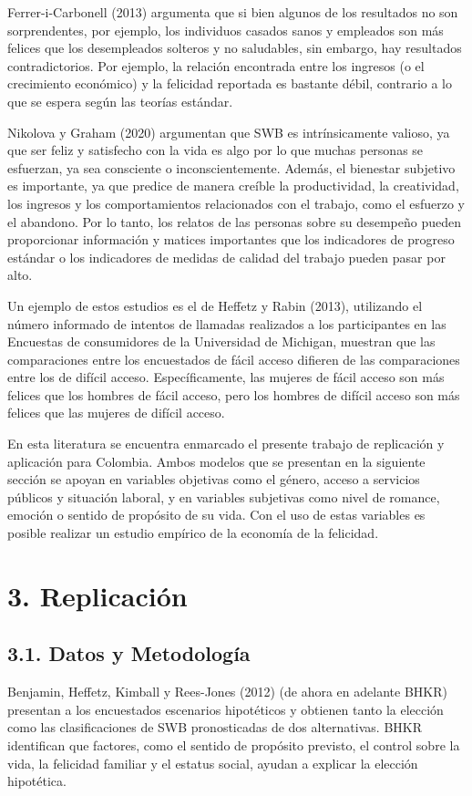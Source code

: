 \documentclass[12pt,spanish]{article}
\begin{document}
Ferrer-i-Carbonell (2013) argumenta que si bien algunos de los resultados no son sorprendentes, por ejemplo, los individuos casados sanos y empleados son más felices que los desempleados solteros y no saludables, sin embargo, hay resultados contradictorios. Por ejemplo, la relación encontrada entre los ingresos (o el crecimiento económico) y la felicidad reportada es bastante débil, contrario a lo que se espera según las teorías estándar. 

Nikolova y Graham (2020) argumentan que SWB es intrínsicamente valioso, ya que ser feliz y satisfecho con la vida es algo por lo que muchas personas se esfuerzan, ya sea consciente o inconscientemente. Además, el bienestar subjetivo es importante, ya que predice de manera creíble la productividad, la creatividad, los ingresos y los comportamientos relacionados con el trabajo, como el esfuerzo y el abandono. Por lo tanto, los relatos de las personas sobre su desempeño pueden proporcionar información y matices importantes que los indicadores de progreso estándar o los indicadores de medidas de calidad del trabajo pueden pasar por alto.

Un ejemplo de estos estudios es el de Heffetz y Rabin (2013),  utilizando el número informado de intentos de llamadas realizados a los participantes en las Encuestas de consumidores de la Universidad de Michigan, muestran que las comparaciones entre los encuestados de fácil acceso difieren de las comparaciones entre los de difícil acceso. Específicamente, las mujeres de fácil acceso son más felices que los hombres de fácil acceso, pero los hombres de difícil acceso son más felices que las mujeres de difícil acceso. 

En esta literatura se encuentra enmarcado el presente trabajo de replicación y aplicación para Colombia. Ambos modelos que se presentan en la siguiente sección se apoyan en variables objetivas como el género, acceso a servicios públicos y situación laboral, y en variables subjetivas como nivel de romance, emoción o sentido de propósito de su vida. Con el uso de estas variables es posible realizar un estudio empírico de la economía de la felicidad. 



\section*{3. Replicación}
\subsection*{3.1. Datos y Metodología}
Benjamin, Heffetz, Kimball y Rees-Jones (2012) (de ahora en adelante BHKR) presentan a los encuestados escenarios hipotéticos y obtienen tanto la elección como las clasificaciones de SWB pronosticadas de dos alternativas. BHKR identifican que factores, como el sentido de propósito previsto, el control sobre la vida, la felicidad familiar y el estatus social, ayudan a explicar la elección hipotética. 
\end{document}
